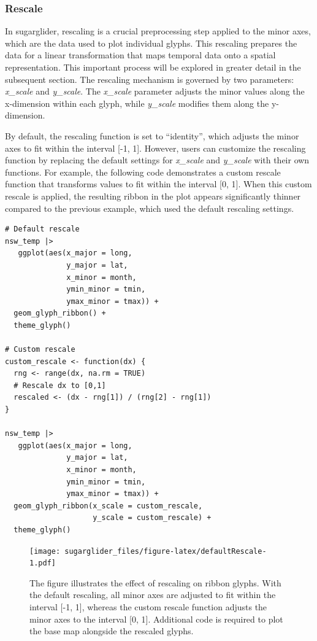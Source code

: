 \hypertarget{rescale}{%
\subsubsection{Rescale}\label{rescale}}

In sugarglider, rescaling is a crucial preprocessing step applied to the minor axes, which are the data used to plot individual glyphs. This rescaling prepares the data for a linear transformation that maps temporal data onto a spatial representation. This important process will be explored in greater detail in the subsequent section. The rescaling mechanism is governed by two parameters: \emph{x\_scale} and \emph{y\_scale}. The \emph{x\_scale} parameter adjusts the minor values along the x-dimension within each glyph, while \emph{y\_scale} modifies them along the y-dimension.

By default, the rescaling function is set to ``identity'', which adjusts the minor axes to fit within the interval {[}-1, 1{]}. However, users can customize the rescaling function by replacing the default settings for \emph{x\_scale} and \emph{y\_scale} with their own functions. For example, the following code demonstrates a custom rescale function that transforms values to fit within the interval {[}0, 1{]}. When this custom rescale is applied, the resulting ribbon in the plot appears significantly thinner compared to the previous example, which used the default rescaling settings.

\begin{verbatim}
# Default rescale 
nsw_temp |>
   ggplot(aes(x_major = long,
              y_major = lat,
              x_minor = month,
              ymin_minor = tmin,
              ymax_minor = tmax)) +
  geom_glyph_ribbon() +
  theme_glyph() 

# Custom rescale 
custom_rescale <- function(dx) {
  rng <- range(dx, na.rm = TRUE)
  # Rescale dx to [0,1]
  rescaled <- (dx - rng[1]) / (rng[2] - rng[1])
}

nsw_temp |>
   ggplot(aes(x_major = long,
              y_major = lat,
              x_minor = month,
              ymin_minor = tmin,
              ymax_minor = tmax)) +
  geom_glyph_ribbon(x_scale = custom_rescale,
                    y_scale = custom_rescale) +
  theme_glyph() 
\end{verbatim}

\begin{figure}
\centering
\texttt{[image: sugarglider\_files/figure-latex/defaultRescale-1.pdf]}
\caption{\label{fig:defaultRescale}The figure illustrates the effect of rescaling on ribbon glyphs. With the default rescaling, all minor axes are adjusted to fit within the interval {[}-1, 1{]}, whereas the custom rescale function adjusts the minor axes to the interval {[}0, 1{]}. Additional code is required to plot the base map alongside the rescaled glyphs.}
\end{figure}

